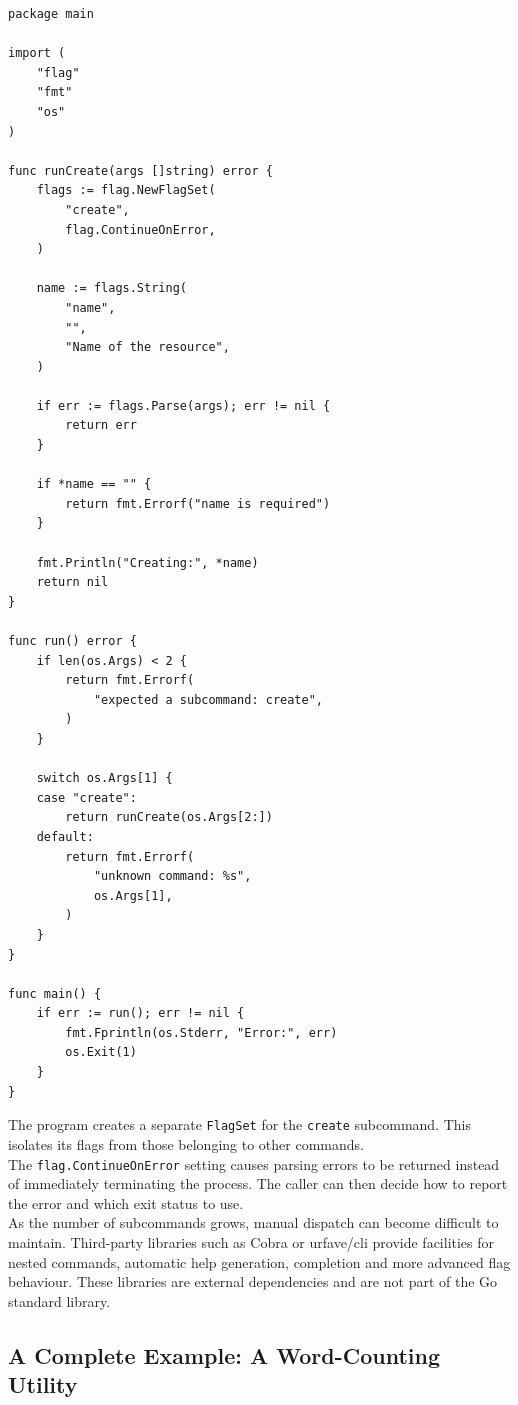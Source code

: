 \begin{lstlisting}
package main

import (
    "flag"
    "fmt"
    "os"
)

func runCreate(args []string) error {
    flags := flag.NewFlagSet(
        "create",
        flag.ContinueOnError,
    )

    name := flags.String(
        "name",
        "",
        "Name of the resource",
    )

    if err := flags.Parse(args); err != nil {
        return err
    }

    if *name == "" {
        return fmt.Errorf("name is required")
    }

    fmt.Println("Creating:", *name)
    return nil
}

func run() error {
    if len(os.Args) < 2 {
        return fmt.Errorf(
            "expected a subcommand: create",
        )
    }

    switch os.Args[1] {
    case "create":
        return runCreate(os.Args[2:])
    default:
        return fmt.Errorf(
            "unknown command: %s",
            os.Args[1],
        )
    }
}

func main() {
    if err := run(); err != nil {
        fmt.Fprintln(os.Stderr, "Error:", err)
        os.Exit(1)
    }
}
\end{lstlisting}

The program creates a separate \texttt{FlagSet} for the \texttt{create} subcommand. This isolates its flags from those belonging to other commands.\\

The \texttt{flag.ContinueOnError} setting causes parsing errors to be returned instead of immediately terminating the process. The caller can then decide how to report the error and which exit status to use.\\

As the number of subcommands grows, manual dispatch can become difficult to maintain. Third-party libraries such as Cobra or urfave/cli provide facilities for nested commands, automatic help generation, completion and more advanced flag behaviour. These libraries are external dependencies and are not part of the Go standard library.\\

\subsection{A Complete Example: A Word-Counting Utility}

